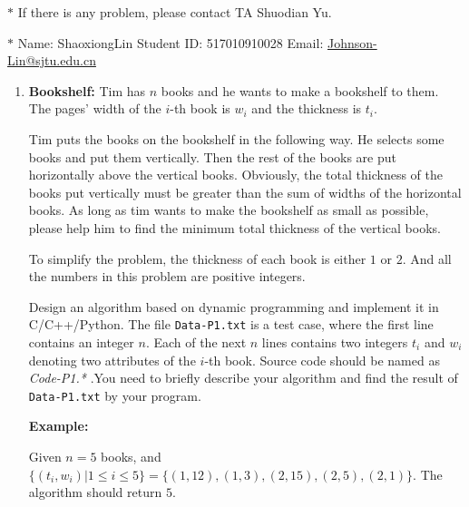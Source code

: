 \documentclass[12pt,a4paper]{article}
\theoremstyle{definition}
\begin{document}
\noindent

\noindent{}
\begin{center}
\footnotesize{\color{red}$*$ If there is any problem, please contact TA Shuodian Yu.}

\footnotesize{\color{blue}$*$ Name: ShaoxiongLin  \quad Student ID: 517010910028 \quad Email: \href{mailto:Johnson-Lin@sjtu.edu.cn}{Johnson-Lin@sjtu.edu.cn}}
\end{center}

\begin{enumerate}
    \item
    \textbf{Bookshelf: }Tim has $n$ books and he wants to make a bookshelf to them. The pages' width of the $i$-th book is $w_i$ and the thickness is $t_i$. 

    Tim puts the books on the bookshelf in the following way. He selects some books and put them vertically. Then the rest of the books are put horizontally above the vertical books. Obviously, the total thickness of the books put vertically must be greater than the sum of widths of the horizontal books. As long as tim wants to make the bookshelf as small as possible, please help him to find the minimum total thickness of the vertical books.

    To simplify the problem, the thickness of each book is either $1$ or $2$. And all the numbers in this problem are positive integers.

    Design an algorithm based on dynamic programming and implement it in C/C++/Python. The file \texttt{Data-P1.txt} is a test case, where the first line contains an integer $n$. Each of the next $n$ lines contains two integers $t_i$ and $w_i$ denoting two attributes of the $i$-th book. Source code should be named as
    {\color{red}\emph{Code-P1.*}} .You need to briefly describe your algorithm and find the result of \texttt{Data-P1.txt} by your program.

    \textbf{Example:}

    Given $n=5$ books, and $\{(t_i,w_i)|1\leq i \leq 5\} = \{(1,12),(1,3),(2,15),(2,5),(2,1)\}$. The algorithm should return $5$.


\end{enumerate}
\end{document}

